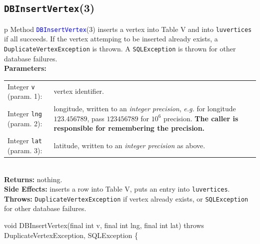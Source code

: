 \subsection{\texttt{DBInsertVertex}(3)}
\begin{tabular}{p{\textwidth}}
\toprule
{}
Method \textcolor{blue}{{\tt{}\protect{}DBInsertVertex}}(3) inserts a vertex into
Table V and into {\tt{}lu{}vertices} if all succeeds. If the vertex attemping
to be inserted already exists, a {\tt{}DuplicateVertexException} is thrown.
A {\tt{}SQLException} is thrown for other database failures.\\
\midrule
\textbf{Parameters:} \\
\begin{tabular}{lp{116mm}}
Integer {\tt{}v} (param. 1):&vertex identifier.\\
Integer {\tt{}lng} (param. 2):&longitude, written to an \emph{integer
precision}, \emph{e.g.} for longitude $123.456789$, pass $123456789$ for
$10^6$ precision. \textbf{The caller is responsible for remembering the
precision.}\\
Integer {\tt{}lat} (param. 3):&latitude, written to an \emph{integer
precision} as above.
\end{tabular}\\
\textbf{Returns:} nothing.\\
\textbf{Side Effects:} inserts a row into Table V, puts an entry into
{\tt{}lu{}vertices}.\\
\textbf{Throws:} {\tt{}DuplicateVertexException} if vertex already exists,
or {\tt{}SQLException} for other database failures.\\
\bottomrule
\end{tabular}
\nwenddocs{}\endmoddef{}
void DBInsertVertex(final int v, final int lng, final int lat)
throws DuplicateVertexException, SQLException \{
\eatline
{}\nwendcode{}
